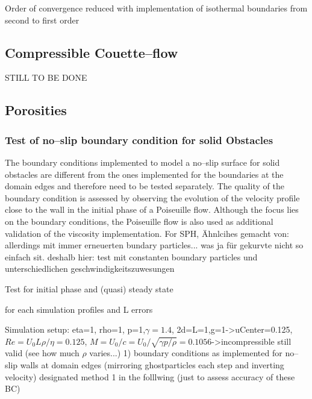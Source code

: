 \documentclass{report}
\begin{document}
Order of convergence reduced with implementation of isothermal boundaries from second to first order \cite{Cleary1999}

\subsection{Compressible Couette--flow}
STILL TO BE DONE

\subsection{Porosities}
\subsubsection{Test of no--slip boundary condition for solid Obstacles}
The boundary conditions implemented to model a no--slip surface for solid obstacles are different from the ones implemented for the boundaries at the domain edges and therefore need to be tested separately. The quality of the boundary condition is assessed by observing the evolution of the velocity profile close to the wall in the initial phase of a Poiseuille flow. Although the focus lies on the boundary conditions, the Poiseuille flow is also used as additional validation of the viscosity implementation. 
For SPH, Ähnlcihes gemacht von: \cite{Basa2009} allerdings mit immer erneuerten bundary particles... was ja für gekurvte nicht so einfach sit. deshalb hier: test mit constanten boundary particles und unterschiedlichen geschwindigkeitszuwesungen


Test for initial phase and (quasi) steady state

for each simulation profiles and L errors

Simulation setup: eta=1, rho=1, p=1,$\gamma=1.4$, 2d=L=1,g=1->uCenter=0.125, $Re=U_0 L \rho/\eta=0.125$, $M=U_0/c=U_0/\sqrt{\gamma p/\rho}=0.1056$->incompressible still valid (see how much $\rho$ varies...)
1) boundary conditions as implemented for no--slip walls at domain edges
(mirroring ghostparticles each step and inverting velocity) designated method 1 in the folllwing
(just to assess accuracy of these BC)
\end{document}
